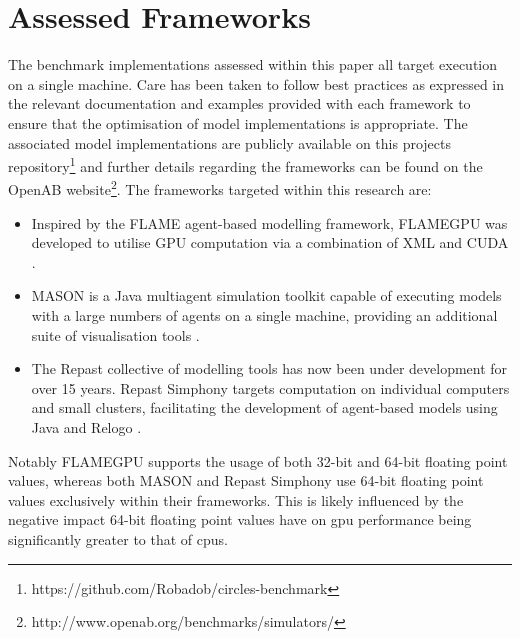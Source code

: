 \section{Assessed Frameworks\label{sec:assessed-frameworks}}
The benchmark implementations assessed within this paper all target execution on a single machine. Care has been taken to follow best practices as expressed in the relevant documentation and examples provided with each framework to ensure that the optimisation of model implementations is appropriate. The associated model implementations are publicly available on this projects repository\footnote{https://github.com/Robadob/circles-benchmark} and further details regarding the frameworks can be found on the OpenAB website\footnote{http://www.openab.org/benchmarks/simulators/}.
The frameworks targeted within this research are:
\begin{itemize}
\item Inspired by the FLAME agent-based modelling framework, FLAMEGPU  was developed to utilise GPU computation via a combination of XML and CUDA \cite{RR082}.
\item MASON is a Java multiagent simulation toolkit capable of executing models with a large numbers of agents on a single machine, providing an additional suite of visualisation tools \cite{LC*04}. 
\item The Repast collective of modelling tools has now been under development for over 15 years. Repast Simphony targets computation on individual computers and small clusters, facilitating the development of agent-based models using Java and Relogo \cite{repast2013}.
\end{itemize}
 Notably FLAMEGPU supports the usage of both 32-bit and 64-bit floating point values, whereas both MASON and Repast Simphony use 64-bit floating point values exclusively within their frameworks. This is likely influenced by the negative impact 64-bit floating point values have on \gls{gpu} performance being significantly greater to that of \glspl{cpu}.
